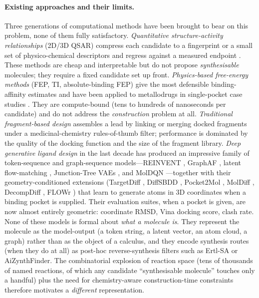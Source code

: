 \paragraph{Existing approaches and their limits.}
Three generations of computational methods have been brought to bear on
this problem, none of them fully satisfactory.
\emph{Quantitative structure-activity relationships} (2D/3D QSAR) compress
each candidate to a fingerprint or a small set of physico-chemical
descriptors and regress against a measured endpoint
\cite{footnote:qsar_review}.
These methods are cheap and interpretable but do not propose {\em
synthesisable} molecules; they require a fixed candidate set up front.
\emph{Physics-based free-energy methods} (FEP, TI, absolute-binding
FEP) give the most defensible binding-affinity estimates and have
been applied to metallodrugs in single-pocket case studies
\cite{footnote:fep_metallo}.
They are compute-bound (tens to hundreds of nanoseconds per
candidate) and do not address the {\em construction} problem at all.
\emph{Traditional fragment-based design} assembles a lead by linking or
merging docked fragments under a medicinal-chemistry rules-of-thumb
filter; performance is dominated by the quality of the docking
function and the size of the fragment library.
\emph{Deep generative ligand design} in the last decade has produced
an impressive family of token-sequence and graph-sequence
models---REINVENT \cite{footnote:reinvent4}, GraphAF
\cite{footnote:graphaf}, latent flow-matching
\cite{footnote:latent_fm}, Junction-Tree VAEs \cite{footnote:jtvae}, and
MolDQN \cite{footnote:moldqn}---together with their
geometry-conditioned extensions (TargetDiff
\cite{footnote:targetdiff}, DiffSBDD \cite{footnote:diffsbdd},
Pocket2Mol \cite{footnote:pocket2mol}, MolDiff \cite{footnote:moldiff},
DecompDiff \cite{footnote:decompdiff}, FLOWr
\cite{footnote:flowr}) that learn to generate atoms in 3D
coordinates when a binding pocket is supplied.
Their evaluation suites, when a pocket is given, are now almost
entirely geometric: coordinate RMSD, Vina docking score, clash rate.
None of these models is formal about {\em what a molecule
is}.
They represent the molecule as the model-output (a token string, a
latent vector, an atom cloud, a graph) rather than as the object of
a calculus, and they encode synthesis routes (when they do at all)
as post-hoc reverse-synthesis filters such as Ertl-SA or
AiZynthFinder.
The combinatorial explosion of reaction space (tens of thousands of
named reactions, of which any candidate ``synthesisable molecule''
touches only a handful) plus the need for chemistry-aware
construction-time constraints therefore motivates a {\em different}
representation.

